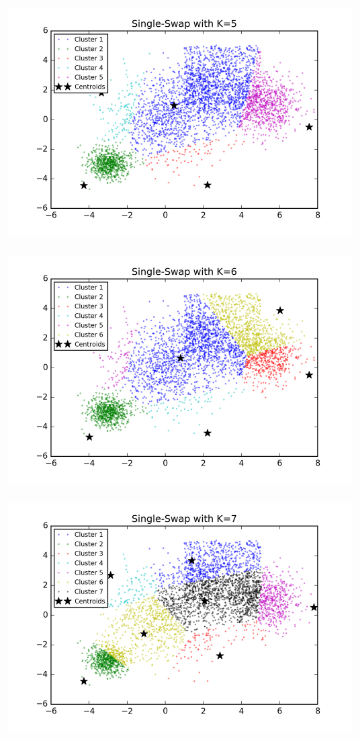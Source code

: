 \begin{figure}[htb]
\begin{subfigure}[b]{0.475\textwidth}
            \includegraphics[width=\textwidth]{./figures/bigClustering_singleSwap_5.png}
        \end{subfigure}
        \hfill
        \begin{subfigure}[b]{0.475\textwidth}   
            \centering 
            \includegraphics[width=\textwidth]{./figures/bigClustering_singleSwap_6.png}
        \end{subfigure}
        \begin{subfigure}[b]{0.475\textwidth}   
            \centering 
            \includegraphics[width=\textwidth]{./figures/bigClustering_singleSwap_7.png}

\end{subfigure}
\end{figure}
